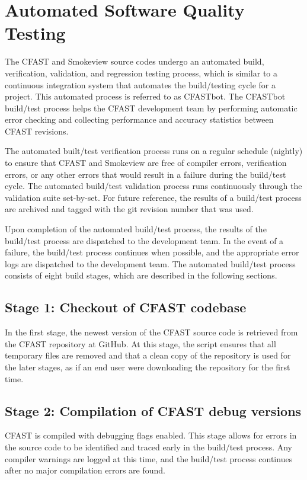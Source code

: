 \documentclass[12pt]{book}
\begin{document}
\section{Automated Software Quality Testing}

The CFAST and Smokeview source codes undergo an automated build, verification, validation, and regression testing process, which is similar to a continuous integration system that automates the build/testing cycle for a project. This automated process is referred to as CFASTbot. The CFASTbot build/test process helps the CFAST development team by performing automatic error checking and collecting performance and accuracy statistics between CFAST revisions.

The automated built/test verification process runs on a regular schedule (nightly) to ensure that CFAST and Smokeview are free of compiler errors, verification errors, or any other errors that would result in a failure during the build/test cycle. The automated build/test validation process runs continuously through the validation suite set-by-set. For future reference, the results of a build/test process are archived and tagged with the git revision number that was used.

Upon completion of the automated build/test process, the results of the build/test process are dispatched to the development team. In the event of a failure, the build/test process continues when possible, and the appropriate error logs are dispatched to the development team.  The automated build/test process consists of eight build stages, which are described in the following sections.

\subsection*{Stage 1: Checkout of CFAST codebase}

In the first stage, the newest version of the CFAST source code is retrieved from the CFAST repository at GitHub. At this stage, the script ensures that all temporary files are removed and that a clean copy of the repository is used for the later stages, as if an end user were downloading the repository for the first time.

\subsection*{Stage 2: Compilation of CFAST debug versions}

CFAST is compiled with debugging flags enabled. This stage allows for errors in the source code to be identified and traced early in the build/test process. Any compiler warnings are logged at this time, and the build/test process continues after no major compilation errors are found.
\end{document}
